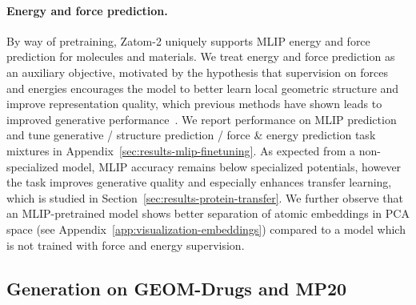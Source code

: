 \documentclass{article} %
\begin{document}
\paragraph{Energy and force prediction.} By way of pretraining, Zatom-2 uniquely supports MLIP energy and force prediction for molecules and materials. We treat energy and force prediction as an auxiliary objective, motivated by the hypothesis that supervision on forces and energies encourages the model to better learn local geometric structure and improve representation quality, which previous methods have shown leads to improved generative performance~\citep{yan2026bettergeometricrepresentationsmolecule}. We report performance on MLIP prediction and tune generative / structure prediction / force \& energy prediction task mixtures in Appendix~\ref{sec:results-mlip-finetuning}. As expected from a non-specialized model, MLIP accuracy remains below specialized potentials, however the task improves generative quality and especially enhances transfer learning, which is studied in Section~\ref{sec:results-protein-transfer}. We further observe that an MLIP-pretrained model shows better separation of atomic embeddings in PCA space (see Appendix~\ref{app:visualization-embeddings}) compared to a model which is not trained with force and energy supervision.

\subsection{Generation on GEOM-Drugs and MP20}
\label{sec:results-standard-benchmarks}
\end{document}
